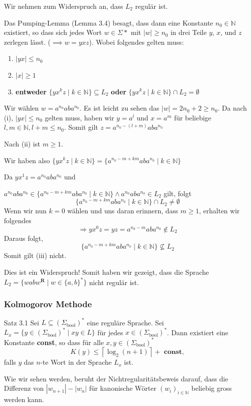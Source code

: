 \documentclass[a4paper, 11pt]{article}
\def\N{\mathbb{N}}
\begin{document}
    Wir nehmen zum Widerspruch an, dass $L_2$ regulär ist. 

Das Pumping-Lemma (Lemma 3.4) besagt, dass dann eine Konstante $n_0 \in \mathbb{N}$ existiert, so dass sich jedes Wort $w \in \Sigma*$ mit $|w| \geq n_0$ in drei Teile $y$, $x$, und $z$ zerlegen lässt. ($\implies w = yxz$). Wobei folgendes gelten muss:
\begin{enumerate}[label=(\roman*)]
    \item  $|yx| \leq n_0$
    \item $|x| \geq 1$
    \item \textbf{entweder} $\{yx^kz \mid k \in \mathbb{N} \} \subseteq L_2$ \textbf{oder} $\{yx^kz \mid k \in \mathbb{N} \} \cap L_2 = \emptyset$
\end{enumerate}

    Wir wählen $w = a^{n_0}aba^{n_0}$. Es ist leicht zu sehen das $|w| = 2n_0 + 2 \geq n_0$. \newline \newline
Da nach (i), $|yx| \leq n_0$ gelten muss, haben wir $y=a^l$ und $x=a^m$ für beliebige $l,m \in \N, l+m \leq n_0$. 
\newline 
Somit gilt $z = a^{n_0 - (l+m)}aba^{n_0}$

Nach (ii) ist $m \geq 1$. 

Wir haben also $\{yx^kz \mid k \in \mathbb{N} \} = \{a^{n_0-m+km}aba^{n_0} \mid k \in \mathbb{N} \}$

    Da $yx^1z = a^{n_0}aba^{n_0}$ und

$a^{n_0}aba^{n_0} \in \{a^{n_0-m+km}aba^{n_0} \mid k \in \mathbb{N} \} \land  a^{n_0}aba^{n_0} \in L_2$ gilt, folgt 
$$\{a^{n_0-m+km}aba^{n_0} \mid k \in \mathbb{N} \}  \cap L_2 \neq \emptyset$$
Wenn wir nun $k = 0$ wählen und uns daran erinnern, dass $m \geq 1$, erhalten wir folgendes
$$\Rightarrow yx^0z = yz = a^{n_0-m}aba^{n_0} \notin L_2$$
Daraus folgt,
$$\{a^{n_0-m+km}aba^{n_0} \mid k \in \N \} \nsubseteq L_2$$
Somit gilt (iii) nicht.

Dies ist ein Widerspruch! Somit haben wir gezeigt, dass die Sprache $L_2 = \{wabw^{\textbf{R}} \mid w \in \{a,b\}^*\}$ nicht regulär ist.




    \subsubsection{Kolmogorov Methode}
    \begin{mainbox}{Satz 3.1}
        Sei $L \subseteq (\Sigma_{\text{bool}})^*$ eine reguläre Sprache. Sei $L_x = \{y \in (\Sigma_{\text{bool}})^* \mid xy \in L\}$ für jedes $x\in (\Sigma_{\text{bool}})^*$. Dann existiert eine Konstante \textbf{const}, so dass für alle $x, y \in (\Sigma_\text{bool})^*$
        $$K(y) \leq \left\lceil \log_2(n+1)\right\rceil + \textbf{ const},$$
        falls $y$ das $n$-te Wort in der Sprache $L_x$ ist.
    \end{mainbox}
    Wie wir sehen werden, beruht der Nichtregularitätsbeweis darauf, dass die Differenz von $|w_{n+1}| - |w_n|$ für kanonische Wörter $(w_i)_{i \in \N}$ beliebig gross werden kann.
\end{document}
